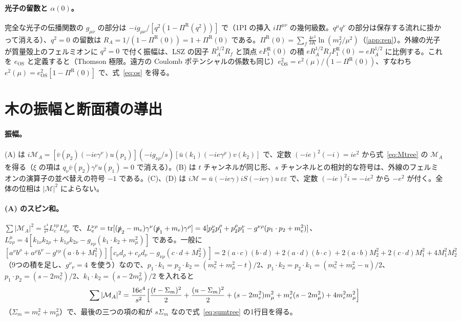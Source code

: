 \documentclass[a4paper,10pt]{ltjsarticle}
\begin{document}
\paragraph{光子の留数と $\alpha(0)$。}完全な光子の伝播関数の $g_{\mu\nu}$ の部分は $-ig_{\mu\nu}/[q^2(1-\Pi^{\mathrm R}(q^2))]$ で（1PI の挿入 $i\Pi^{\mu\nu}$ の幾何級数。$q^\mu q^\nu$ の部分は保存する流れに掛かって消える）、$q^2=0$ の留数は $R_A=1/(1-\Pi^{\mathrm R}(0))=1+\Pi^{\mathrm R}(0)$ である。$\Pi^{\mathrm R}(0)=\sum_f\frac{4e^2}{3K}\ln(m_f^2/\mu^2)$（\ref{app:ren}）。外線の光子が質量殻上のフェルミオンに $q^2=0$ で付く振幅は、LSZ の因子 $R_A^{1/2}R_f$ と頂点 $eF_1^{\mathrm R}(0)$ の積 $eR_A^{1/2}R_fF_1^{\mathrm R}(0)=eR_A^{1/2}$ に比例する。これを $e_{\mathrm{OS}}$ と定義すると（Thomson 極限。遠方の Coulomb ポテンシャルの係数も同じ）$e_{\mathrm{OS}}^2=e^2(\mu)/(1-\Pi^{\mathrm R}(0))$、すなわち $e^2(\mu)=e_{\mathrm{OS}}^2[1-\Pi^{\mathrm R}(0)]$ で、式~\eqref{eq:os} を得る。

\section{木の振幅と断面積の導出}\label{app:tree}

\paragraph{振幅。}(A) は $i\mathcal M_A=[\bar v(p_2)(-ie\gamma^\nu)u(p_1)](-ig_{\nu\rho}/s)[\bar u(k_1)(-ie\gamma^\rho)v(k_2)]$ で、定数 $(-ie)^2(-i)=ie^2$ から式~\eqref{eq:Mtree} の $\mathcal M_A$ を得る（$\xi$ の項は $q_\nu\bar v(p_2)\gamma^\nu u(p_1)=0$ で消える）。(B) は $t$ チャンネルが同じ形、$s$ チャンネルとの相対的な符号は、外線のフェルミオンの演算子の並べ替えの符号 $-1$ である。(C)、(D) は $i\mathcal M=\bar u(-ie\gamma)iS(-ie\gamma)u\,\varepsilon\varepsilon$ で、定数 $(-ie)^2i=-ie^2$ から $-e^2$ が付く。全体の位相は $|\mathcal M|^2$ によらない。

\paragraph{(A) のスピン和。}$\sum|\mathcal M_A|^2=\frac{e^4}{s^2}L_e^{\nu\rho}L^\mu_{\nu\rho}$ で、$L_e^{\nu\rho}=\mathrm{tr}[(\slashed p_2-m_e)\gamma^\nu(\slashed p_1+m_e)\gamma^\rho]=4[p_2^\nu p_1^\rho+p_2^\rho p_1^\nu-g^{\nu\rho}(p_1\cdot p_2+m_e^2)]$、$L^\mu_{\nu\rho}=4[k_{1\nu}k_{2\rho}+k_{1\rho}k_{2\nu}-g_{\nu\rho}(k_1\cdot k_2+m_\mu^2)]$ である。一般に $[a^\nu b^\rho+a^\rho b^\nu-g^{\nu\rho}(a\cdot b+M_1^2)][c_\nu d_\rho+c_\rho d_\nu-g_{\nu\rho}(c\cdot d+M_2^2)]=2(a\cdot c)(b\cdot d)+2(a\cdot d)(b\cdot c)+2(a\cdot b)M_2^2+2(c\cdot d)M_1^2+4M_1^2M_2^2$（9つの積を足し、$g^\nu{}_\nu=4$ を使う）なので、$p_1\cdot k_1=p_2\cdot k_2=(m_e^2+m_\mu^2-t)/2$、$p_1\cdot k_2=p_2\cdot k_1=(m_e^2+m_\mu^2-u)/2$、$p_1\cdot p_2=(s-2m_e^2)/2$、$k_1\cdot k_2=(s-2m_\mu^2)/2$ を入れると
\begin{equation*}
\sum|\mathcal M_A|^2=\frac{16e^4}{s^2}\Bigl[\frac{(t-\Sigma_m)^2}{2}+\frac{(u-\Sigma_m)^2}{2}+(s-2m_e^2)m_\mu^2+m_e^2(s-2m_\mu^2)+4m_e^2m_\mu^2\Bigr]
\end{equation*}
（$\Sigma_m=m_e^2+m_\mu^2$）で、最後の三つの項の和が $s\Sigma_m$ なので式~\eqref{eq:sumtree} の1行目を得る。
\end{document}
